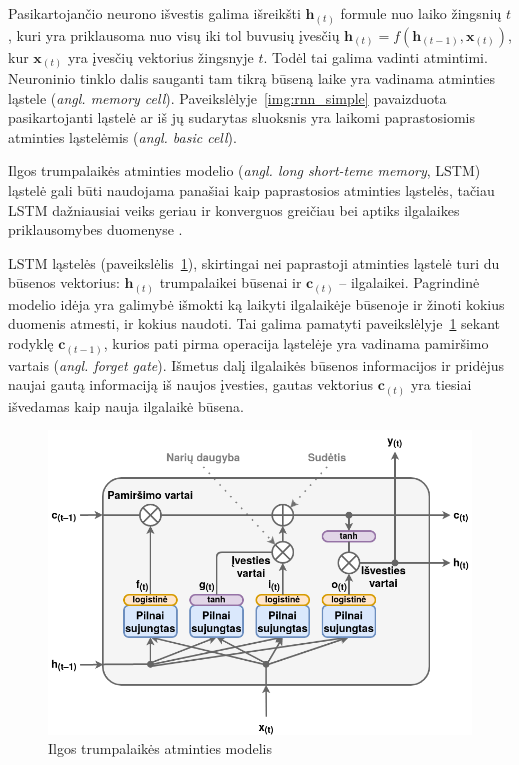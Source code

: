 \documentclass{VUMIFPSbakalaurinis}
\begin{document}
{	Pasikartojančio neurono išvestis galima išreikšti \(\mathbf{h}_{(t)}\) formule nuo laiko žingsnių \(t\), kuri yra priklausoma nuo visų iki tol buvusių įvesčių \(\mathbf{h}_{(t)} = f(\mathbf{h}_{(t-1)}, \mathbf{x}_{(t)})\), kur \(\mathbf{x}_{(t)}\) yra įvesčių vektorius žingsnyje \(t\). Todėl tai galima vadinti atmintimi. Neuroninio tinklo dalis sauganti tam tikrą būseną laike yra vadinama atminties ląstele (\textit{angl. memory cell}). Paveikslėlyje~\ref{img:rnn_simple} pavaizduota pasikartojanti ląstelė ar iš jų sudarytas sluoksnis yra laikomi paprastosiomis atminties ląstelėmis (\textit{angl. basic cell}).
}
\label{subsubsubsec:lstm}
{
	Ilgos trumpalaikės atminties modelio (\textit{angl. long short-teme memory}, LSTM) ląstelė \cite{hochreiter_schmidhuber_1997, sak2014long} gali būti naudojama panašiai kaip paprastosios atminties ląstelės, tačiau LSTM dažniausiai veiks geriau ir konverguos greičiau bei aptiks ilgalaikes priklausomybes duomenyse \cite{handson}.\par
	
	LSTM ląstelės (paveikslėlis~\ref{img:lstm}), skirtingai nei paprastoji atminties ląstelė turi du būsenos vektorius: \(\mathbf{h}_{(t)}\) trumpalaikei būsenai ir  \(\mathbf{c}_{(t)}\) -- ilgalaikei. Pagrindinė modelio idėja yra galimybė išmokti ką laikyti ilgalaikėje būsenoje ir žinoti kokius duomenis atmesti, ir kokius naudoti. Tai galima pamatyti paveikslėlyje~\ref{img:lstm} sekant rodyklę \(\mathbf{c}_{(t-1)}\), kurios pati pirma operacija ląstelėje yra vadinama pamiršimo vartais (\textit{angl. forget gate}). Išmetus dalį ilgalaikės būsenos informacijos ir pridėjus naujai gautą informaciją iš naujos įvesties, gautas vektorius \(\mathbf{c}_{(t)}\) yra tiesiai išvedamas kaip nauja ilgalaikė būsena.
	
	\begin{figure}[H]
		\centering
		\includegraphics[scale=0.33]{img/lstm}
		\caption{Ilgos trumpalaikės atminties modelis}
		\label{img:lstm}
	\end{figure} 

}
\end{document}
